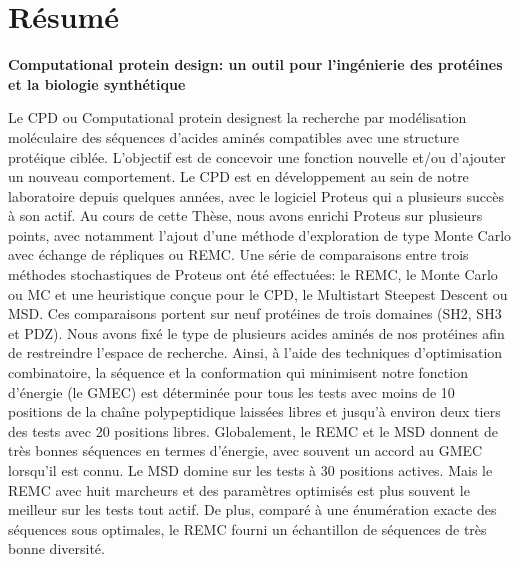 

\section*{Résumé}

{\large\bf\noindent Computational protein design: un outil pour l’ingénierie des protéines et la biologie synthétique}

\bigskip

Le CPD ou \og Computational protein design\fg est la recherche par modélisation moléculaire des séquences d’acides aminés compatibles avec une structure protéique ciblée.
L’objectif est de concevoir une fonction nouvelle et/ou d’ajouter un nouveau comportement.
Le CPD est en développement au sein de notre laboratoire depuis quelques années, avec le logiciel Proteus qui a plusieurs succès à son actif.
Au cours de cette Thèse, nous avons enrichi Proteus sur plusieurs points, avec notamment l’ajout d’une méthode d’exploration de type Monte Carlo avec échange de répliques ou REMC. Une série de comparaisons entre trois méthodes stochastiques de Proteus ont été effectuées: le REMC, le Monte Carlo ou MC et une heuristique conçue pour le CPD, le \og Multistart Steepest Descent \fg ou MSD. Ces comparaisons portent sur neuf protéines de trois domaines (SH2, SH3 et PDZ). Nous avons fixé le type de plusieurs acides aminés de nos protéines afin de restreindre l’espace de recherche. Ainsi, à l'aide des techniques d’optimisation combinatoire, la séquence et la conformation qui minimisent notre fonction d’énergie (le GMEC) est déterminée pour tous les tests avec moins de 10 positions de la chaîne polypeptidique laissées libres et jusqu’à environ deux tiers des tests avec 20 positions libres. Globalement, le REMC et le MSD donnent de très bonnes séquences en termes d’énergie, avec souvent un accord au GMEC lorsqu’il est connu. Le MSD domine sur les tests à 30 positions actives. Mais le REMC avec huit marcheurs et des paramètres optimisés est plus souvent le meilleur sur les tests tout actif. De plus, comparé à une énumération exacte des séquences sous optimales, le REMC fourni un échantillon de séquences de très bonne diversité.

